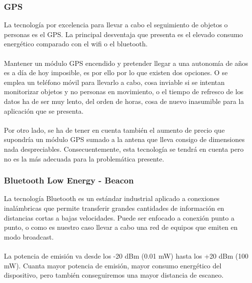 \documentclass[paper=a4, fontsize=11pt,twoside]{scrartcl}	%
\begin{document}
        \subsubsection {GPS}
            La tecnología por excelencia para llevar a cabo el seguimiento de objetos o personas es el GPS. La principal desventaja
            que presenta es el elevado consumo energético comparado con el wifi o el bluetooth.
            \paragraph{}
            Mantener un módulo GPS encendido y pretender llegar a una autonomía de años es a día de hoy
            imposible, es por ello por lo que existen dos opciones.
            O se emplea un teléfono móvil para llevarlo a cabo, cosa inviable si se intentan monitorizar objetos y no personas en
            movimiento, o el tiempo de refresco de los datos ha de ser muy lento, del orden de horas,
            cosa de nuevo inasumible para la aplicación que se presenta.
            \paragraph{}
            Por otro lado, se ha de tener en cuenta también el aumento de precio que supondría un módulo GPS sumado a la antena que lleva consigo de 
            dimensiones nada despreciables. 
            Consecuentemente, esta tecnología se tendrá en cuenta pero no es la más adecuada para la problemática presente.
        \subsubsection {Bluetooth Low Energy - Beacon}
            La tecnología Bluetooth es un estándar industrial aplicado a conexiones inalámbricas que permite transferir 
            grandes cantidades de información en distancias cortas a bajas velocidades. Puede ser enfocado a conexión
            punto a punto, o como es nuestro caso llevar a cabo una red de equipos que emiten en modo broadcast.
            \paragraph{}
            La potencia de emisión va desde los -20 dBm (0.01 mW) hasta los +20 dBm (100 mW). Cuanta mayor potencia de emisión, mayor consumo energético
            del dispositivo, pero también conseguiremos una mayor distancia de escaneo.
\end{document}
